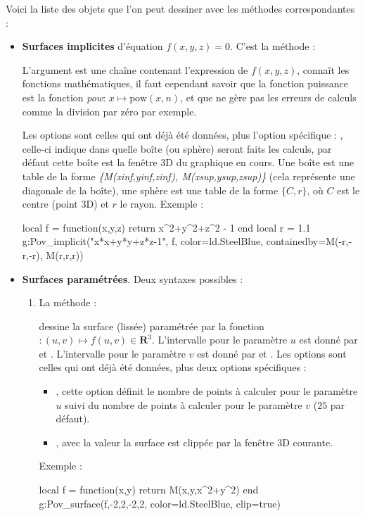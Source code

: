 Voici la liste des objets que l'on peut dessiner avec les méthodes correspondantes :
\begin{itemize}
    \item \textbf{Surfaces implicites} d'équation $f(x,y,z)=0$. C'est la méthode :
    
    L'argument  est une chaîne contenant l'expression de $f(x,y,z)$, \povray connaît les fonctions mathématiques, il faut cependant savoir que la fonction puissance est la fonction \emph{pow}: $x\mapsto \mathrm{pow}(x,n)$, et que \povray ne gère pas les erreurs de calculs comme la division par zéro par exemple.
    
    Les options sont celles qui ont déjà été données, plus l'option spécifique : , celle-ci indique dans quelle boîte (ou sphère) seront faits les calculs, par défaut cette boîte est la fenêtre 3D du graphique en cours. Une boîte est une table de la forme \emph{\{M(xinf,yinf,zinf), M(xsup,ysup,zsup)\}} (cela représente une diagonale de la boîte), une sphère est une table de la forme $\{C,r\}$, où $C$ est le centre (point 3D) et $r$ le rayon. Exemple :
    \begin{Luacode}
    local f = function(x,y,z) return x^2+y^2+z^2 - 1 end
    local r = 1.1
    g:Pov_implicit("x*x+y*y+z*z-1", f, {color=ld.SteelBlue, containedby={M(-r,-r,-r), M(r,r,r)}})
    \end{Luacode}

    \item \textbf{Surfaces paramétrées}. Deux syntaxes possibles :
    \begin{enumerate}
        \item La méthode : 
        
        dessine la surface (lissée) paramétrée par la fonction $\colon(u,v) \mapsto f(u,v)\in \mathbf R^3$. L'intervalle pour le paramètre $u$ est donné par  et . L'intervalle pour le paramètre $v$ est donné par  et . Les options sont celles qui ont déjà été données, plus deux options spécifiques : 
        \begin{itemize}
            \item {}, cette option définit le nombre de points à calculer pour le paramètre $u$ suivi du nombre de points à calculer pour le paramètre $v$ ($25$ par défaut).
            \item {}, avec la valeur \true la surface est clippée par la fenêtre 3D courante.
        \end{itemize}
        Exemple :
        \begin{Luacode}
        local f = function(x,y) return M(x,y,x^2+y^2) end
        g:Pov_surface(f,-2,2,-2,2, {color=ld.SteelBlue, clip=true})
        \end{Luacode}
        

\end{enumerate}
\end{itemize}
